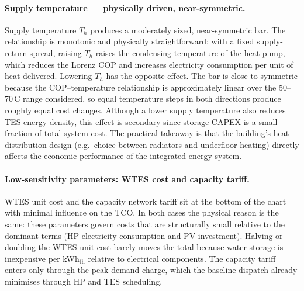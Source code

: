 \documentclass[11pt,a4paper]{report}
\begin{document}
\paragraph{Supply temperature --- physically driven, near-symmetric.}
Supply temperature $T_h$ produces a moderately sized, near-symmetric bar.
The relationship is monotonic and physically straightforward: with a fixed
supply-return spread, raising $T_h$ raises the condensing temperature of the
heat pump, which reduces the Lorenz COP and increases electricity consumption
per unit of heat delivered.
Lowering $T_h$ has the opposite effect.
The bar is close to symmetric because the COP--temperature relationship is
approximately linear over the 50--70\,\textdegree C range considered, so
equal temperature steps in both directions produce roughly equal cost
changes.
Although a lower supply temperature also reduces TES energy density, this
effect is secondary since storage CAPEX is a small fraction of total system
cost.
The practical takeaway is that the building's heat-distribution design
(e.g.\ choice between radiators and underfloor heating) directly affects the
economic performance of the integrated energy system.

\paragraph{Low-sensitivity parameters: WTES cost and capacity tariff.}
WTES unit cost and the capacity network tariff sit at the bottom of the chart
with minimal influence on the TCO.
In both cases the physical reason is the same: these parameters govern costs
that are structurally small relative to the dominant terms (HP electricity
consumption and PV investment).
Halving or doubling the WTES unit cost barely moves the total because water
storage is inexpensive per kWh$_\mathrm{th}$ relative to electrical
components.
The capacity tariff enters only through the peak demand charge, which the
baseline dispatch already minimises through HP and TES scheduling.
\end{document}
